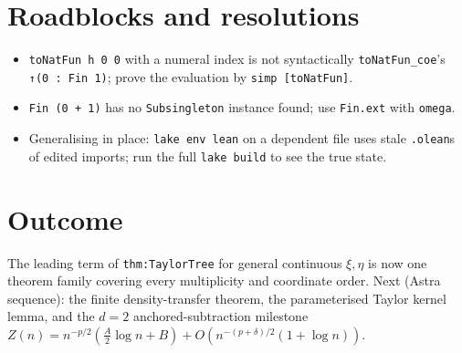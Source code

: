 \documentclass[11pt]{article}
\begin{document}
\section{Roadblocks and resolutions}
\begin{itemize}
\item \texttt{toNatFun h 0 0} with a numeral index is not syntactically \texttt{toNatFun\_coe}'s
\texttt{↑(0 : Fin 1)}; prove the evaluation by \texttt{simp [toNatFun]}.
\item \texttt{Fin (0 + 1)} has no \texttt{Subsingleton} instance found; use \texttt{Fin.ext} with
\texttt{omega}.
\item Generalising in place: \texttt{lake env lean} on a dependent file uses stale \texttt{.olean}s of
edited imports; run the full \texttt{lake build} to see the true state.
\end{itemize}

\section{Outcome}
The leading term of \texttt{thm:TaylorTree} for general continuous $\xi,\eta$ is now one theorem
family covering every multiplicity and coordinate order. Next (Astra sequence): the finite
density-transfer theorem, the parameterised Taylor kernel lemma, and the $d=2$ anchored-subtraction
milestone $Z(n)=n^{-p/2}(\tfrac A2\log n+B)+O(n^{-(p+\delta)/2}(1+\log n))$.
\end{document}
